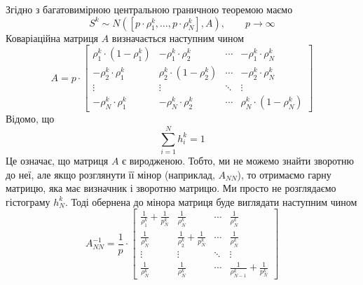Згідно з багатовимірною центральною граничною теоремою маємо
\begin{equation*}
  S^k
  \sim N\left( \left[ p \cdot \rho_1^k, \dots, p \cdot \rho_N^k \right],
    A \right),
  \qquad p\to\infty
\end{equation*}
Коваріаційна матриця $A$ визначається наступним чином
\begin{equation*}
  A = p \cdot
    \begin{bmatrix}
      \rho_1^k \cdot \left( 1 - \rho_1^k \right) & - \rho_1^k \cdot \rho_2^k
                                      & \cdots & - \rho_1^k \cdot \rho_N^k \\
      - \rho_2^k \cdot \rho_1^k                  & \rho_2^k \cdot
          \left( 1 - \rho_2^k \right) & \cdots & - \rho_2^k \cdot \rho_N^k \\
      \vdots                                     & \vdots
                                      & \ddots & \vdots \\
       - \rho_N^k \cdot \rho_1^k                 & - \rho_N^k \cdot \rho_2^k
                                      & \cdots & \rho_N^k \cdot \left( 1 - \rho_N^k \right)
    \end{bmatrix}
\end{equation*}
Відомо, що 
\begin{equation*}
  \sum_{i=1}^{N} h_i^k = 1
\end{equation*}
Це означає, що матриця $A$ є виродженою. Тобто, ми не можемо знайти зворотню до
неї, але якщо розглянути її мінор (наприклад, $A_{NN}$), то отримаємо гарну
матрицю, яка має визначник і зворотню матрицю. Ми просто не розглядаємо
гістограму $h_N^k$. Тоді обернена до мінора матриця буде виглядати наступним
чином
\begin{equation*}
  A_{NN}^{-1} = \frac{1}{p} \cdot
    \begin{bmatrix}
      \frac{1}{\rho_1^k}+\frac{1}{p_N^k} & \frac{1}{\rho_N^k}
        & \cdots & \frac{1}{\rho_N^k}                 \\
      \frac{1}{\rho_N^k}                 & \frac{1}{\rho_2^k}+\frac{1}{p_N^k}
        & \cdots & \frac{1}{\rho_N^k}                 \\
      \vdots                             & \vdots
        & \ddots & \vdots                             \\
      \frac{1}{\rho_N^k}                 & \frac{1}{\rho_N^k}
        & \cdots & \frac{1}{\rho_{N-1}^k}+\frac{1}{p_N^k}
    \end{bmatrix}
\end{equation*}
